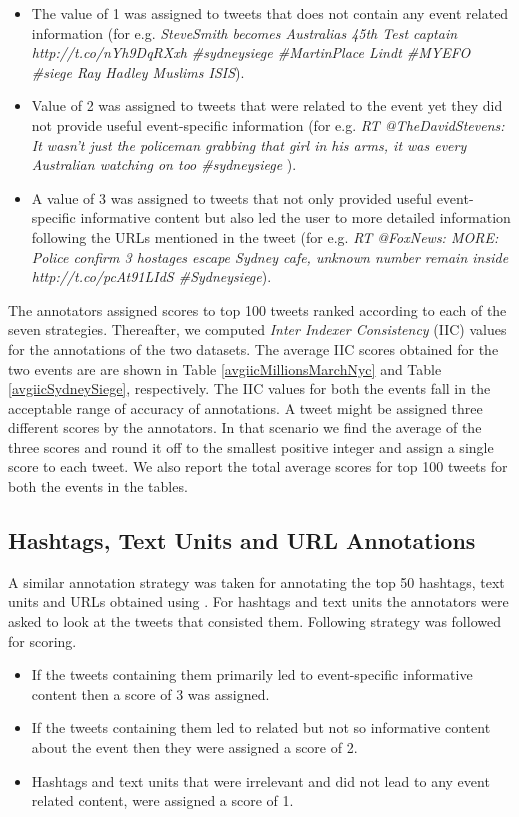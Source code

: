 \begin{itemize}
\item The value of 1 was assigned to tweets that does not contain any event related information (for e.g. \textit{SteveSmith becomes Australias 45th Test captain http://t.co/nYh9DqRXxh \#sydneysiege \#MartinPlace Lindt \#MYEFO \#siege Ray Hadley Muslims ISIS}). 
\item Value of 2 was assigned to tweets that were related to the event yet they did not provide useful event-specific information (for e.g. \textit{RT @TheDavidStevens: It wasn't just the policeman grabbing that girl in his arms, it was every Australian watching on too \#sydneysiege} ). 
\item A value of 3 was assigned to tweets that not only provided useful event-specific informative content but also led the user to more detailed information following the URLs mentioned in the tweet (for e.g. \textit{RT @FoxNews: MORE: Police confirm 3 hostages escape Sydney cafe, unknown number remain inside http://t.co/pcAt91LIdS \#Sydneysiege}).  
\end{itemize}



The annotators assigned scores to top 100 tweets ranked according to each of the seven strategies. Thereafter, we computed \textit{Inter Indexer Consistency} (IIC) values \cite{rolling1981indexing} for the annotations of the two datasets. The average IIC scores obtained for the two events are are shown in Table \ref{avgiicMillionsMarchNyc} and Table \ref{avgiicSydneySiege}, respectively. The IIC values for both the events fall in the acceptable range of accuracy of annotations. A tweet might be assigned three different scores by the annotators. In that scenario we find the average of the three scores and round it off to the smallest positive integer and assign a single score to each tweet. We also report the total average scores for top 100 tweets for both the events in the tables. 

\subsection{Hashtags, Text Units and URL Annotations}
A similar annotation strategy was taken for annotating the top 50 hashtags, text units and URLs obtained using . For hashtags and text units the annotators were asked to look at the tweets that consisted them. Following strategy was followed for scoring.

\begin{itemize}
\item If the tweets containing them primarily led to event-specific informative content then a score of 3 was assigned.

\item If the tweets containing them led to related but not so informative content about the event then they were assigned a score of 2.

\item Hashtags and text units that were irrelevant and did not lead to any event related content, were assigned a score of 1.
\end{itemize}

